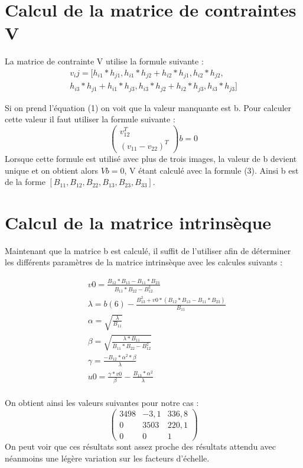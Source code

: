 \documentclass[a4paper,10pt]{article}
\begin{document}
\section{Calcul de la matrice de contraintes V}
La matrice de contrainte V utilise la formule suivante :
\begin{multline}
 v_ij = [h_{i1}*h_{j1}, h_{i1}*h_{j2} + h_{i2}*h_{j1}, h_{i2}*h_{j2},  \\
 h_{i3}*h_{j1} + h_{i1}*h_{j3}, h_{i3}*h_{j2} + h_{i2}*h_{j3}, h_{i3}*h_{j3}]
\end{multline}

Si on prend l'équation (1) on voit que la valeur manquante est b. Pour calculer cette valeur il faut
utiliser la formule suivante :
\begin{equation}
 \begin{pmatrix}v^T_{12}\\(v_{11}-v_{22})^T\end{pmatrix}b=0
\end{equation}
Lorsque cette formule est utilisé avec plus de trois images, la valeur de b devient unique et on obtient
alors $Vb=0$, V étant calculé avec la formule (3). Ainsi b est de la forme $[B_{11}, B_{12}, B_{22}, B_{13}, B_{23}, B_{33}]$.

\section{Calcul de la matrice intrinsèque}
Maintenant que la matrice b est calculé, il suffit de l'utiliser afin de déterminer les différents 
paramètres de la matrice intrinsèque avec les calcules suivants : 

\begin{align}
  &v0     = \frac{B_{12}*B_{13} - B_{11}*B_{23}}{B_{11}*B_{22} - B^2_{12}}\\
  &\lambda = b(6) - \frac{B^2_{13} + v0 * (B_{12} * B_{13} - B_{11} * B_{23})}{B_{11}}\\
  &\alpha  = \sqrt{\frac{\lambda}{B_{11}}}\\
  &\beta   = \sqrt{\frac{\lambda*B_{11}}{B_{11}*B_{22} - B^2_{12}}}\\
  &\gamma  = \frac{-B_{12}*\alpha^2*\beta}{\lambda}\\
  &u0     = \frac{\gamma *v0}{\beta} - \frac{B_{13}*\alpha^2}{\lambda}\\
\end{align}

On obtient ainsi les valeurs suivantes pour notre cas : 
$$\begin{pmatrix} 3498 & -3,1 & 336,8\\0 & 3503 & 220,1\\ 0 & 0 & 1\end{pmatrix}$$
On peut voir que ces résultats sont assez proche des résultats attendu avec néanmoins
une légère variation sur les facteurs d'échelle.
\end{document}
